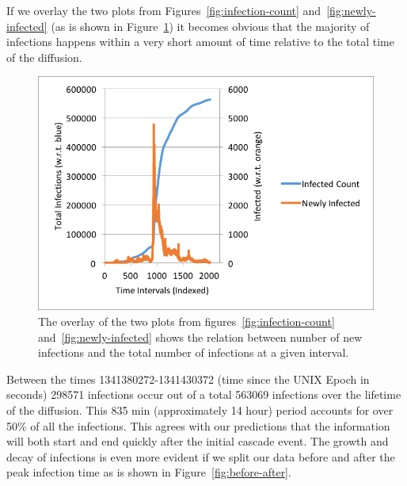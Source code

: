\documentclass[12pt, oneside, openany]{article} %
\begin{document}
If we overlay the two plots from Figures~\ref{fig:infection-count} and~\ref{fig:newly-infected} (as is shown in Figure~\ref{fig:overlay}) it becomes obvious that the majority of infections happens within a very short amount of time relative to the total time of the diffusion.

\begin{figure}
\centering
    \includegraphics{overlay.png}
    \caption{The overlay of the two plots from figures~\ref{fig:infection-count} and~\ref{fig:newly-infected} shows the relation between number of new infections and the total number of infections at a given interval.}
    \label{fig:overlay}
\end{figure}

Between the times 1341380272-1341430372 (time since the UNIX Epoch in seconds) 298571 infections occur out of a total 563069 infections over the lifetime of the diffusion. This 835 min (approximately 14 hour) period accounts for over 50\% of all the infections. This agrees with our predictions that the information will both start and end quickly after the initial cascade event. The growth and decay of infections is even more evident if we split our data before and after the peak infection time as is shown in Figure~\ref{fig:before-after}.
\end{document}
